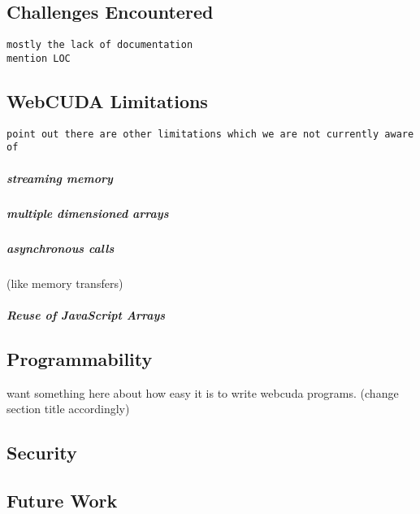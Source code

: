 
\subsection{Challenges Encountered}
\begin{verbatim}
mostly the lack of documentation
mention LOC
\end{verbatim}

\subsection{WebCUDA Limitations}
\begin{verbatim}
point out there are other limitations which we are not currently aware of 
\end{verbatim}
\subparagraph{streaming memory}
\subparagraph{multiple dimensioned arrays}
\subparagraph{asynchronous calls} (like memory transfers)
\subparagraph{Reuse of JavaScript Arrays}

\subsection{Programmability}
want something here about how easy it is to write webcuda programs. (change section title accordingly)

\subsection{Security}
\subsection{Future Work}
